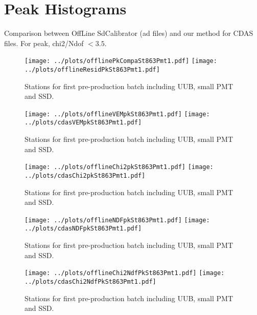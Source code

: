 \documentclass[twoside, final, 10pt]{articleMine}
\begin{document}
\clearpage

\section*{Peak Histograms}
Comparison between OffLine SdCalibrator (ad files) and our method for CDAS files.
For peak, chi2/Ndof $<3.5$.

\begin{figure}[!tbh]
  \centering
  \subfigure
  {
    \texttt{[image: ../plots/offlinePkCompaSt863Pmt1.pdf]}
    \texttt{[image: ../plots/offlineResidPkSt863Pmt1.pdf]}
  }
  \caption{Stations for first pre-production batch including UUB, small PMT and SSD.}
  \label{figPkVemserie}
\end{figure}

\begin{figure}[!tbh]
  \centering
  \subfigure
  {
    \texttt{[image: ../plots/offlineVEMpkSt863Pmt1.pdf]}
    \texttt{[image: ../plots/cdasVEMpkSt863Pmt1.pdf]}
  }
  \caption{Stations for first pre-production batch including UUB, small PMT and SSD.}
  \label{figPkVemserie}
\end{figure}


\begin{figure}[!tbh]
  \centering
  \subfigure
  {
    \texttt{[image: ../plots/offlineChi2pkSt863Pmt1.pdf]}
    \texttt{[image: ../plots/cdasChi2pkSt863Pmt1.pdf]}
  }
  \caption{Stations for first pre-production batch including UUB, small PMT and SSD.}
  \label{figPkNdfserie}
\end{figure}


\begin{figure}[!tbh]
  \centering
  \subfigure
  {
    \texttt{[image: ../plots/offlineNDFpkSt863Pmt1.pdf]}
    \texttt{[image: ../plots/cdasNDFpkSt863Pmt1.pdf]}
  }
  \caption{Stations for first pre-production batch including UUB, small PMT and SSD.}
  \label{figPkNdfserie}
\end{figure}


\begin{figure}[!tbh]
  \centering
  \subfigure
  {
    \texttt{[image: ../plots/offlineChi2NdfPkSt863Pmt1.pdf]}
    \texttt{[image: ../plots/cdasChi2NdfPkSt863Pmt1.pdf]}
  }
  \caption{Stations for first pre-production batch including UUB, small PMT and SSD.}
  \label{figPkChi2Ndfserie}
\end{figure}
\end{document}
